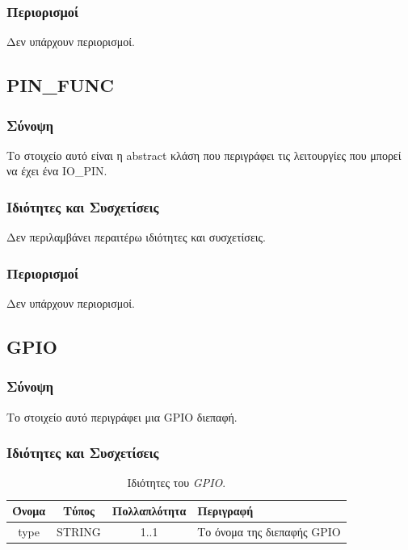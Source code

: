\subsubsection*{Περιορισμοί}

\noindent Δεν υπάρχουν περιορισμοί.

\subsection{PIN\_FUNC}
\label{subsec:pin_func}

\subsubsection*{Σύνοψη}

\noindent Το στοιχείο αυτό είναι η abstract κλάση που περιγράφει τις λειτουργίες που μπορεί να έχει ένα IO\_PIN.

\subsubsection*{Ιδιότητες και Συσχετίσεις}

\noindent Δεν περιλαμβάνει περαιτέρω ιδιότητες και συσχετίσεις.

\subsubsection*{Περιορισμοί}

\noindent Δεν υπάρχουν περιορισμοί.

\subsection{GPIO}
\label{subsec:gpio}

\subsubsection*{Σύνοψη}

\noindent Το στοιχείο αυτό περιγράφει μια GPIO διεπαφή.

\subsubsection*{Ιδιότητες και Συσχετίσεις}

\begin{table}[H]
	\begin{center}
		\caption{Ιδιότητες του \textit{GPIO}.}
		\label{tab:gpio1}
		\begin{tabular}{ | c | c | c| m{5.5cm} | }
			\hline
			\rowcolor{Gray}
			Όνομα & Τύπος & Πολλαπλότητα & Περιγραφή \\
			\hline
			type & STRING & 1..1 & Το όνομα της διεπαφής GPIO \\
			\hline
		\end{tabular}
	\end{center}
\end{table}

